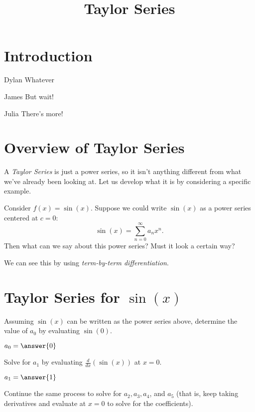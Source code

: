 \documentclass{ximera}
\title{Taylor Series}
\begin{document}
\maketitle

\section*{Introduction}

\begin{dialogue}
\item[Dylan] Whatever
\item[James] But wait!
\item[Julia] There's more!
\end{dialogue}


\section{Overview of Taylor Series}

A \emph{Taylor Series} is just a power series, so it isn't anything different from what we've already been looking at. Let us develop what it is by considering a specific example.

Consider $f(x) = \sin(x)$. Suppose we could write $\sin(x)$ as a power series centered at $c=0$:
\[
    \sin(x) = \sum_{n=0}^{\infty} a_n x^n.
\]
Then what can we say about this power series? Must it look a certain way? 
\begin{multipleChoice}
\begin{feedback}[correct]
We can see this by using \emph{term-by-term differentiation}.
\end{feedback}
\end{multipleChoice}

\section{Taylor Series for $\sin(x)$}

Assuming $\sin(x)$ can be written as the power series above, determine the value of $a_0$ by evaluating $\sin(0)$.

$a_0 = \answer{0}$

Solve for $a_1$ by evaluating $\frac{d}{dx}(\sin(x))$ at $x=0$.

$a_1 = \answer{1}$

Continue the same process to solve for $a_2, a_3, a_4$, and $a_5$ (that is, keep taking derivatives and evaluate at $x=0$ to solve for the coefficients).
\end{document}
